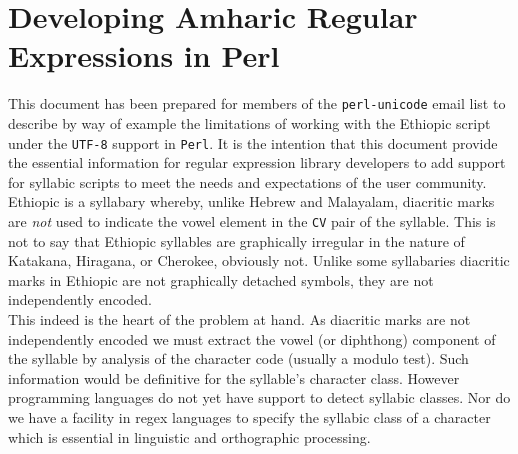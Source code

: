 
\section*{Developing Amharic Regular Expressions in Perl}
\centerline{\large\textbf{\textit{{\beG}{\daG}{\nG}{\EG}{\lG}{\spaceG}{\yaG}{\IIG}{\qoG}{\bG}}}}
\vspace*{0.4in}





\noi
This document has been prepared for members of the \texttt{perl-unicode} email
list to describe by way of example the limitations of working with the Ethiopic
script under the \texttt{UTF-8} support in \texttt{Perl}.  It is the intention
that this document provide the essential information for regular expression 
library developers to add support for syllabic scripts to meet the needs and
expectations of the user community.\\


\noi
Ethiopic is a syllabary whereby, unlike Hebrew and Malayalam, diacritic marks
are \emph{not} used to indicate the vowel element in the \texttt{CV} pair of the
syllable.  This is not to say that Ethiopic syllables are graphically irregular
in the nature of Katakana, Hiragana, or Cherokee, obviously not.  Unlike some
syllabaries diacritic marks in Ethiopic are not graphically detached symbols,
they are not independently encoded.\\

\noi
This indeed is the heart of the problem at hand.  As diacritic marks are not
independently encoded we must extract the vowel (or diphthong) component
of the syllable by analysis of the character code (usually a modulo test).
Such information would be definitive for the syllable's character class.
However programming languages do not yet have support to detect syllabic
classes.  Nor do we have a facility in regex languages to specify the
syllabic class of a character which is essential in linguistic and orthographic
processing.\\

